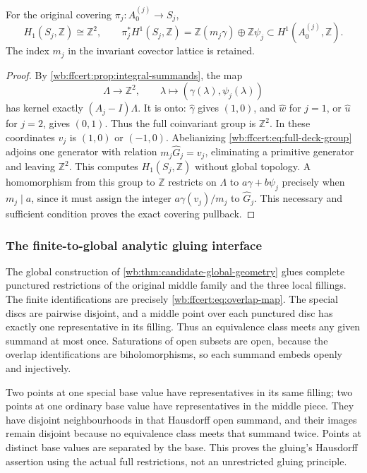 \begin{corollary}
\label{wb:ffcert:cor:covering-h1}
For the original covering $\pi_j:A_0^{(j)}\to S_j$,
\[
 H_1(S_j,\mathbb Z)\cong\mathbb Z^2,\qquad
 \pi_j^*H^1(S_j,\mathbb Z)
   =\mathbb Z(m_j\gamma)\oplus\mathbb Z\psi_j
        \subset H^1(A_0^{(j)},\mathbb Z).
 \tag{FF40}\label{wb:ffcert:eq:integral-h1-image}
\]
The index $m_j$ in the invariant covector lattice is retained.
\end{corollary}

\begin{proof}
By \cref{wb:ffcert:prop:integral-summands}, the map
\[
 \Lambda\longrightarrow\mathbb Z^2,\qquad
 \lambda\longmapsto(\gamma(\lambda),\psi_j(\lambda))
 \tag{FF41}\label{wb:ffcert:eq:coinvariant-coordinates}
\]
has kernel exactly $(A_j-I)\Lambda$. It is onto:
$\widehat\gamma$ gives $(1,0)$, and $\widehat w$ for $j=1$,
or $\widehat u$ for $j=2$, gives $(0,1)$. Thus the full
coinvariant group is $\mathbb Z^2$. In these coordinates $v_j$
is $(1,0)$ or $(-1,0)$. Abelianizing
\eqref{wb:ffcert:eq:full-deck-group} adjoins one generator with relation
$m_j\widehat G_j=v_j$, eliminating a primitive generator and
leaving $\mathbb Z^2$. This computes $H_1(S_j,\mathbb Z)$ without
global topology. A homomorphism from this group to $\mathbb Z$
restricts on $\Lambda$ to $a\gamma+b\psi_j$ precisely when
$m_j\mid a$, since it must assign the integer
$a\gamma(v_j)/m_j$ to $\widehat G_j$. This necessary and sufficient
condition proves the exact covering pullback.
\end{proof}

\subsubsection{The finite-to-global analytic gluing interface}

The global construction of \cref{wb:thm:candidate-global-geometry} glues
complete punctured restrictions of the original middle family and
the three local fillings. The finite identifications are precisely
\eqref{wb:ffcert:eq:overlap-map}. The special discs are pairwise disjoint,
and a middle point over each punctured disc has exactly one
representative in its filling. Thus an equivalence class meets any
given summand at most once. Saturations of open subsets are open,
because the overlap identifications are biholomorphisms, so each summand
embeds openly and injectively.

Two points at one special base value have representatives in its same
filling; two points at one ordinary base value have representatives in
the middle piece. They have disjoint neighbourhoods in that Hausdorff
open summand, and their images remain disjoint because no equivalence
class meets that summand twice. Points at distinct base values are
separated by the base. This proves the gluing's Hausdorff assertion
using the actual full restrictions, not an unrestricted gluing principle.

